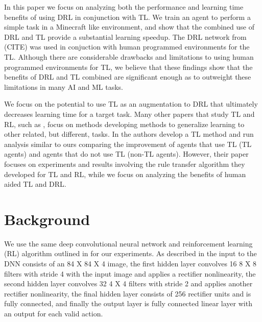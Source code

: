 \documentclass{llncs}
\begin{document}
In this paper we focus on analyzing both the performance and learning time benefits of using DRL in conjunction with TL. 
We train an agent to perform a simple task in a Minecraft like environment, and show that the combined use of DRL and TL provide a substantial learning speedup.
The DRL network from (CITE) was used in conjuction with human programmed environments for the TL.
Although there are considerable drawbacks and limitations to using human programmed environments for TL, we believe that these findings show that the benefits of DRL and TL combined are significant enough as to outweight these limitations in many AI and ML tasks. 

We focus on the potential to use TL as an augmentation to DRL that ultimately decreases learning time for a target task.
Many other papers that study TL and RL, such as \citep{ramon2007transfer}, focus on methods developing methods to generalize learning to other related, but different, tasks. 
In \citep{taylor2007cross} the authors develop a TL method and run analysis similar to ours comparing the improvement of agents that use TL (TL agents) and agents that do not use TL (non-TL agents).
However, their paper focuses on experiments and results involving the rule transfer algorithm they developed for TL and RL, while we focus on analyzing the benefits of human aided TL and DRL.

%

%
\section{Background}

We use the same deep convolutional neural network and reinforcement learning (RL) algorithm outlined in \citep{mnih2015human} for our experiments. 
As described in \citep{mnih2015human} the input to the DNN consists of an 84 X 84 X 4 image, the first hidden layer convolves 16 8 X 8 filters with stride 4 with the input image and applies a rectifier nonlinearity, the second hidden layer convolves 32 4 X 4 filters with stride 2 and applies another rectifier nonlinearity, the final hidden layer consists of 256 rectifier units and is fully connected, and finally the output layer is fully connected linear layer with an output for each valid action. 
\end{document}
